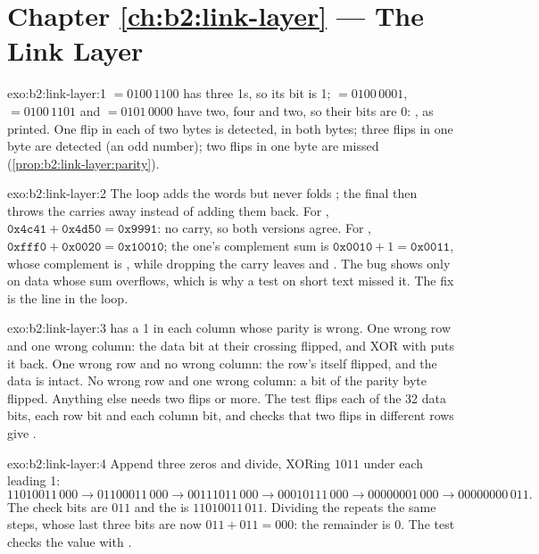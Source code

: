 \section*{Chapter \ref{ch:b2:link-layer} --- The Link Layer}

\begin{solution}{exo:b2:link-layer:1}
 $= 0100\,1100$ has three 1s, so its bit is 1;  $= 0100\,0001$,  $= 0100\,1101$ and
 $= 0101\,0000$ have two, four and two, so their bits are 0: \code{[1, 0, 0, 0]}, as printed. One flip in
each of two bytes is detected, in both bytes; three flips in one byte are detected (an odd number); two flips in one
byte are missed (\cref{prop:b2:link-layer:parity}).
\end{solution}

\begin{solution}{exo:b2:link-layer:2}
The loop adds the words but never folds ; the final  then throws the
carries away instead of adding them back. For , $\mathtt{0x4c41} + \mathtt{0x4d50} = \mathtt{0x9991}$:
no carry, so both versions agree. For , $\mathtt{0xfff0} + \mathtt{0x0020} = \mathtt{0x10010}$; the
one's complement sum is $\mathtt{0x0010} + 1 = \mathtt{0x0011}$, whose complement is , while dropping the
carry leaves  and . The bug shows only on data whose sum overflows, which is why a test on
short text missed it. The fix is the line  in the loop.
\end{solution}

\begin{solution}{exo:b2:link-layer:3}
 has a 1 in each column whose parity is wrong. One wrong row and one wrong column: the data bit at their
crossing flipped, and XOR with  puts it back. One wrong row and no wrong column: the row's 
itself flipped, and the data is intact. No wrong row and one wrong column: a bit of the parity byte flipped. Anything
else needs two flips or more. The test flips each of the 32 data bits, each row bit and each column bit, and checks
that two flips in different rows give .
\end{solution}

\begin{solution}{exo:b2:link-layer:4}
Append three zeros and divide, XORing $1011$ under each leading 1:
\[
11010011\,000 \to 01100011\,000 \to 00111011\,000 \to 00010111\,000 \to 00000001\,000 \to 00000000\,011 .
\]
The check bits are $011$ and the  is $11010011\,011$. Dividing the  repeats the same steps, whose last
three bits are now $011 + 011 = 000$: the remainder is 0. The test checks the value with .
\end{solution}

